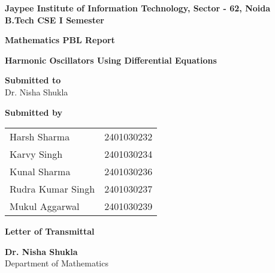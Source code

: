 \documentclass[12pt,a4paper]{article}
\begin{document}
\begin{titlepage}
    \centering
    
    \Huge
    \textbf{Jaypee Institute of Information Technology, Sector - 62, Noida } \\
    \vspace{0.5cm}
    \Large
    \textbf{B.Tech CSE I Semester}\\
    \vspace{1cm}
    \vspace*{\fill}
    
    
    \vspace{1.5cm}
    \Huge
    \textbf{Mathematics PBL Report}\\
    \Large
    
    \textbf{Harmonic Oscillators Using Differential Equations}\\
    \vspace{1cm}

    \Large
    \textbf{Submitted to}\\
    Dr. Nisha Shukla
    \vspace{1cm}

    \textbf{Submitted by}
    \vspace{0.5cm}

    \begin{tabular}{ll}
        Harsh Sharma & 2401030232 \\
        Karvy Singh & 2401030234 \\
        Kunal Sharma & 2401030236 \\
        Rudra Kumar Singh & 2401030237 \\
        Mukul Aggarwal & 2401030239 \\
    \end{tabular}

    \vspace*{\fill}
    \normalsize
\end{titlepage}

\begin{center}
    \Large\textbf{Letter of Transmittal}
\end{center}
\vspace{1cm}

\noindent
\textbf{Dr. Nisha Shukla} \\
[0.5em]
Department of Mathematics \\
[0.5em]
\end{document}
